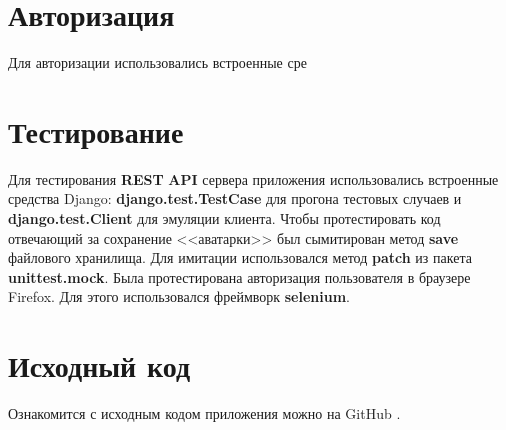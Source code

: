 \section{Авторизация}
Для авторизации использовались встроенные сре
\section{Тестирование}
Для тестирования \textbf{REST} \textbf{API} сервера приложения использовались встроенные средства Django: \textbf{django.test.TestCase} для прогона тестовых случаев и \textbf{django.test.Client} для эмуляции клиента.
Чтобы протестировать код отвечающий за сохранение <<аватарки>> был сымитирован метод \textbf{save} файлового хранилища. Для имитации использовался метод \textbf{patch} из пакета \textbf{unittest.mock}. Была протестирована авторизация пользователя в браузере Firefox. Для этого использовался фреймворк \textbf{selenium}.
\section{Исходный код}
Ознакомится с исходным кодом приложения можно на GitHub \cite{project_source}.
\pagebreak
